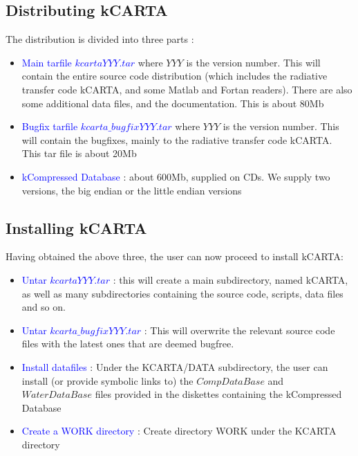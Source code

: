 \documentclass[12pt]{article}
\newcommand{\kc}{\textsf{kCARTA}\xspace}
\begin{document}
\subsection{Distributing \kc}
The distribution is divided into three parts :

\begin{itemize}
\item \textcolor{blue} {Main tarfile $kcartaYYY.tar$} where $YYY$ is the 
version number. This will contain the entire source code distribution (which 
includes the radiative transfer code \kc, and some Matlab and Fortan readers).
There are also some additional data files, and the documentation. This is 
about 80Mb\\
\item \textcolor{blue} {Bugfix tarfile $kcarta\_bugfixYYY.tar$} where $YYY$ 
is the version number.
This will contain the bugfixes, mainly to the radiative transfer code \kc. This
tar file is about 20Mb \\
\item \textcolor{blue} {kCompressed Database} : about 600Mb, supplied on CDs. 
We supply two versions, the big endian or the little endian versions \\
\end{itemize}

\subsection{Installing \kc}
Having obtained the above three, the user can now proceed to install \kc :
\begin{itemize}
\item \textcolor{blue} {Untar $kcartaYYY.tar$} :  this will create a main 
subdirectory, named \kc,
as well as many subdirectories containing the source code, scripts, data files
and so on.
\item \textcolor{blue} {Untar $kcarta\_bugfixYYY.tar$} :  This will overwrite 
the relevant source code files with the latest ones that are deemed bugfree. 
\item \textcolor{blue} {Install datafiles} : Under the KCARTA/DATA 
subdirectory, the user can install (or provide symbolic links to) the 
$CompDataBase$ and $WaterDataBase$ files provided in the diskettes 
containing the kCompressed Database
\item \textcolor{blue} {Create a WORK directory} : Create directory WORK
under the KCARTA directory
\end{itemize}
\end{document}
